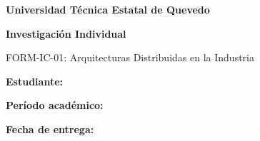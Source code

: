 \begin{titlepage}
\singlespacing
\begin{center}
  \vspace*{0.5cm}
  {\Large\bfseries Universidad Técnica Estatal de Quevedo}\par
  \vspace{0.5cm}
  {\large\bfseries \facultad}\par
  \vspace{1.2cm}
  {\large\bfseries \asignatura}\par
  \vspace{0.25cm}
  \carrera\par
  \vspace{0.15cm}
  \curso\par
  \vfill
  {\Large\bfseries Investigación Individual}\par
  \vspace{0.7cm}
  {\LARGE\bfseries \nombreproyecto\par}
  \vspace{0.6cm}
  {\large FORM-IC-01: Arquitecturas Distribuidas en la Industria}\par
  \vfill
  \textbf{Estudiante:}\par
  \vspace{0.3cm}
  \estudiante\par
  \vfill
\textbf{Período académico:} \periodoacademico\par
\vspace{0.3cm}
\textbf{Fecha de entrega:} \fechadeentrega\par
\vspace*{0.4cm}
\end{center}
\end{titlepage}
